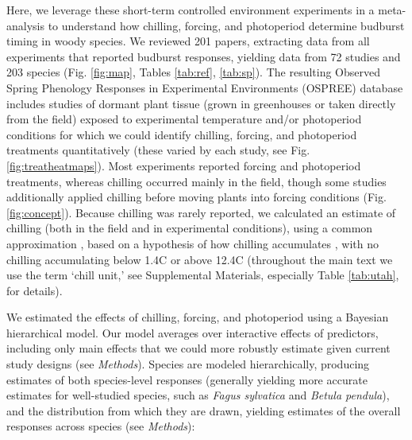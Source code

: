 \documentclass{article}
\begin{document}
\par Here, we leverage these short-term controlled environment experiments in a meta-analysis to understand how chilling, forcing, and photoperiod determine budburst timing in woody species. We reviewed 201 papers, extracting data from all experiments that reported budburst responses, yielding data from 72 studies and 203 species (Fig. \ref{fig:map}, Tables \ref{tab:ref}, \ref{tab:sp}). The resulting Observed Spring Phenology Responses in Experimental Environments (OSPREE) database includes studies of dormant plant tissue (grown in greenhouses or taken directly from the field) exposed to experimental temperature and/or photoperiod conditions \emph{\citep{wolkovich2019}} for which we could identify chilling, forcing, and photoperiod treatments quantitatively (these varied by each study, see Fig. \ref{fig:treatheatmaps}). Most experiments reported forcing and photoperiod treatments, whereas chilling occurred mainly in the field, though some studies additionally applied chilling before moving plants into forcing conditions (Fig. \ref{fig:concept}). Because chilling was rarely reported, we calculated an estimate of chilling (both in the field and in experimental conditions), using a common approximation \emph{\citep{richardson1974}}, based on a hypothesis of how chilling accumulates \emph{\citep{dennis2003}}, with no chilling accumulating below 1.4\degree C or above 12.4\degree C (throughout the main text we use the term `chill unit,' see Supplemental Materials, especially Table \ref{tab:utah}, for details). 

\par We estimated the effects of chilling, forcing, and photoperiod using a Bayesian hierarchical model. Our model averages over interactive effects of predictors, including only main effects that we could more robustly estimate given current study designs (see \emph{Methods}). Species are modeled hierarchically, producing estimates of both species-level responses (generally yielding more accurate estimates for well-studied species, such as \emph{Fagus sylvatica} and \emph{Betula pendula}), and the distribution from which they are drawn, yielding estimates of the overall responses across species (see \emph{Methods}): 
\end{document}
